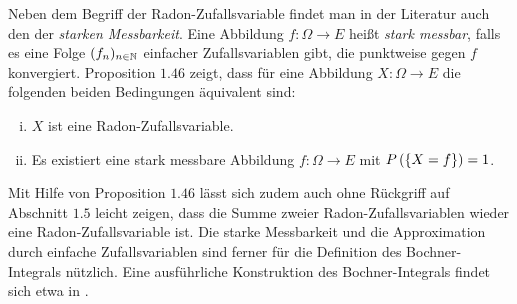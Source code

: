 \begin{remark}
    Neben dem Begriff der Radon-Zufallsvariable findet man in der Literatur auch den der \textit{starken Messbarkeit}.
    Eine Abbildung $f:\Omega \to E$ heißt \textit{stark messbar}, falls es eine Folge $(f_n)_{n \in \mathbb{N}}$ einfacher Zufallsvariablen gibt, die punktweise gegen $f$ konvergiert. 
    Proposition $1.46$ zeigt, dass für eine Abbildung $X: \Omega \to E$ die folgenden beiden Bedingungen äquivalent sind:
    \begin{enumerate}[(i)]
        \item $X$ ist eine Radon-Zufallsvariable. 
        \item Es existiert eine stark messbare Abbildung $f:\Omega \to E$ mit $P\left(\left\{ X=f \right\}\right) = 1$. 
    \end{enumerate}
    Mit Hilfe von Proposition $1.46$ lässt sich zudem auch ohne Rückgriff auf Abschnitt $1.5$ leicht zeigen, dass die Summe zweier Radon-Zufallsvariablen wieder eine Radon-Zufallsvariable ist. 
    Die starke Messbarkeit und die Approximation durch einfache Zufallsvariablen sind ferner für die Definition des Bochner-Integrals nützlich. 
    Eine ausführliche Konstruktion des Bochner-Integrals findet sich etwa in \cite{van-neerven1}. 
\end{remark}


